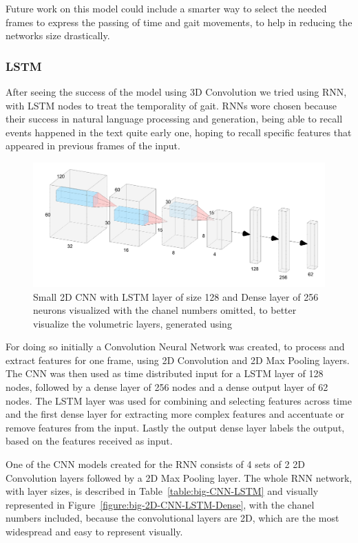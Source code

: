 \documentclass[12pt]{article}
\theoremstyle{definition}
\begin{document}
	Future work on this model could include a smarter way to select the needed frames to express the passing of time and gait movements, to help in reducing the networks size drastically.

	\subsubsection{LSTM}


	After seeing the success of the model using 3D Convolution we tried using RNN, with LSTM nodes to treat the temporality of gait. RNNs wore chosen because their success in natural language processing and generation, being able to recall events happened in the text quite early one, hoping to recall specific features that appeared in previous frames of the input.

	\begin{figure}[ht]
		\includegraphics[width=\textwidth]{networks/small-2D-CNN-LSTM-Dense.png}
		\caption{Small 2D CNN with LSTM layer of size 128 and Dense layer of 256 neurons visualized with the chanel numbers omitted, to better visualize the volumetric layers, generated using \cite{nn-svg}}
		\label{figure:small-2D-CNN-LSTM-Dense}
	\end{figure}

	For doing so initially a Convolution Neural Network was created, to process and extract features for one frame, using 2D Convolution and 2D Max Pooling layers. The CNN was then used as time distributed input for a LSTM layer of 128 nodes, followed by a dense layer of 256 nodes and a dense output layer of 62 nodes.
	The LSTM layer was used for combining and selecting features across time and the first dense layer for extracting more complex features and accentuate or remove features from the input. Lastly the output dense layer labels the output, based on the features received as input.

	One of the CNN models created for the RNN consists of 4 sets of 2 2D Convolution layers followed by a 2D Max Pooling layer. The whole RNN network, with layer sizes, is described in Table~\ref{table:big-CNN-LSTM} and visually represented in Figure~\ref{figure:big-2D-CNN-LSTM-Dense}, with the chanel numbers included, because the convolutional layers are 2D, which are the most widespread and easy to represent visually.
\end{document}
